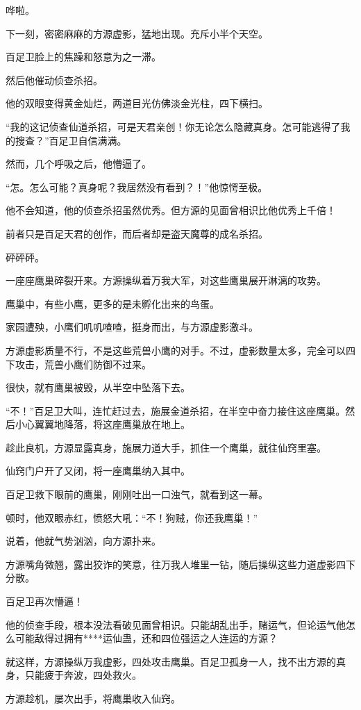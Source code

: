 \begin{this_body}
哗啦。

下一刻，密密麻麻的方源虚影，猛地出现。充斥小半个天空。

百足卫脸上的焦躁和怒意为之一滞。

然后他催动侦查杀招。

他的双眼变得黄金灿烂，两道目光仿佛淡金光柱，四下横扫。

“我的这记侦查仙道杀招，可是天君亲创！你无论怎么隐藏真身。怎可能逃得了我的搜查？”百足卫自信满满。

然而，几个呼吸之后，他懵逼了。

“怎。怎么可能？真身呢？我居然没有看到？！”他惊愕至极。

他不会知道，他的侦查杀招虽然优秀。但方源的见面曾相识比他优秀上千倍！

前者只是百足天君的创作，而后者却是盗天魔尊的成名杀招。

砰砰砰。

一座座鹰巢碎裂开来。方源操纵着万我大军，对这些鹰巢展开淋漓的攻势。

鹰巢中，有些小鹰，更多的是未孵化出来的鸟蛋。

家园遭殃，小鹰们叽叽喳喳，挺身而出，与方源虚影激斗。

方源虚影质量不行，不是这些荒兽小鹰的对手。不过，虚影数量太多，完全可以四下攻击，荒兽小鹰们防御不过来。

很快，就有鹰巢被毁，从半空中坠落下去。

“不！”百足卫大叫，连忙赶过去，施展金道杀招，在半空中奋力接住这座鹰巢。然后小心翼翼地降落，将这座鹰巢放在地上。

趁此良机，方源显露真身，施展力道大手，抓住一个鹰巢，就往仙窍里塞。

仙窍门户开了又闭，将一座鹰巢纳入其中。

百足卫救下眼前的鹰巢，刚刚吐出一口浊气，就看到这一幕。

顿时，他双眼赤红，愤怒大吼：“不！狗贼，你还我鹰巢！”

说着，他就气势汹汹，向方源扑来。

方源嘴角微翘，露出狡诈的笑意，往万我人堆里一钻，随后操纵这些力道虚影四下分散。

百足卫再次懵逼！

他的侦查手段，根本没法看破见面曾相识。只能胡乱出手，赌运气，但论运气他怎么可能敌得过拥有****运仙蛊，还和四位强运之人连运的方源？

就这样，方源操纵万我虚影，四处攻击鹰巢。百足卫孤身一人，找不出方源的真身，只能疲于奔波，四处救火。

方源趁机，屡次出手，将鹰巢收入仙窍。


\end{this_body}
